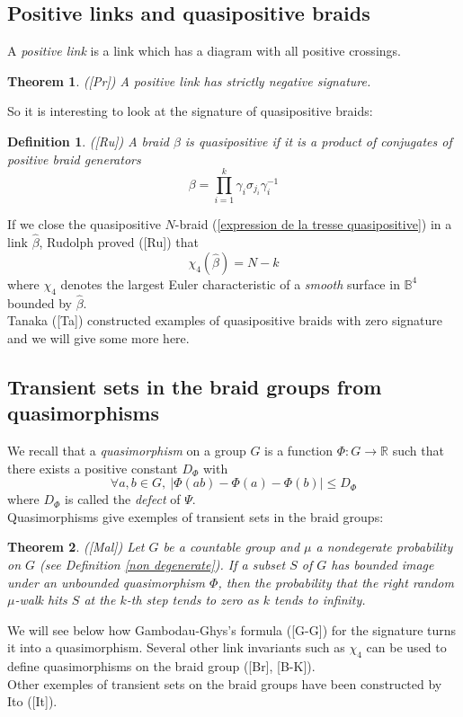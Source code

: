 \documentclass[10pt,a4paper]{amsart}
\newtheorem{defn}{Definition}
\newtheorem{thm}{Theorem}
\newcounter{constant}
\begin{document}
\subsection{Positive links and quasipositive braids}
A {\it positive link} is a link which has a diagram with all positive crossings.
\begin{thm}([Pr])
	A positive link has strictly negative signature.
\end{thm} 
So it is interesting to look at the signature of quasipositive braids:
\begin{defn} ([Ru])
	A braid $\beta$ is {\it quasipositive} if it is a product of conjugates of positive braid generators
	\begin{equation}\label{expression de la tresse quasipositive}
	\beta=\prod_{i=1}^k\gamma_{i}\sigma_{j_i}\gamma_{i}^{-1}
	\end{equation}
\end{defn}
If we close the  quasipositive $N$-braid (\ref{expression de la tresse quasipositive}) in a link $\hat{\beta}$, Rudolph proved ([Ru]) that
\begin{equation}\label{quasipositif.link}
\chi_4(\hat{\beta})=N-k
\end{equation}
where $\chi_4$ denotes the largest Euler characteristic of a {\it smooth} surface in $\mathbb{B}^4$ bounded by $\hat{\beta}$.\\
Tanaka ([Ta]) constructed examples of quasipositive braids with zero signature and we will give some more here.

\subsection{Transient sets in the braid groups from quasimorphisms}
 We recall that 
a {\it quasimorphism} on a group $G$ is a function $\Phi:G\longrightarrow \mathbb{R}$ such that there exists a positive constant $D_\Phi$ with
\begin{equation}\label{quasimorphisme}
\forall a,b\in G,\ |\Phi(ab)-\Phi(a)-\Phi(b)|\leq D_\Phi
\end{equation}
where $D_\Phi$ is called the {\it defect} of $\Psi$.\\
Quasimorphisms give exemples of transient sets in the braid groups:
\begin{thm}\label{malyutin}
	([Mal]) Let $G$ be a countable group and $\mu$ a nondegerate probability on $G$ (see Definition \ref{non degenerate}). If  a subset $S$ of $G$ has bounded image under an unbounded quasimorphism $\Phi$, then the probability that the right random $\mu$-walk hits $S$ at the $k$-th step tends to zero as $k$ tends to infinity.
\end{thm}
We will see below how Gambodau-Ghys's formula ([G-G]) for the signature turns it into a quasimorphism.  Several other link invariants such as $\chi_4$ can be used to define   quasimorphisms on the braid group ([Br], [B-K]).\\
Other exemples of transient sets on the braid groups have been constructed by Ito ([It]).
\end{document}
